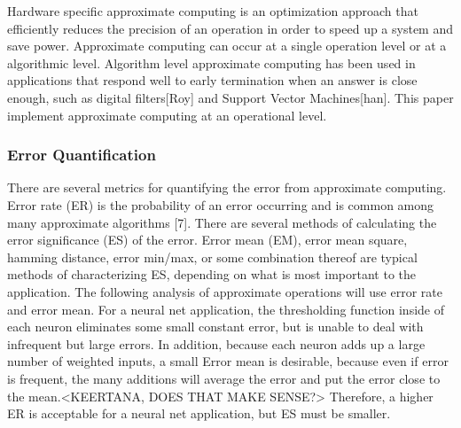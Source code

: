\documentclass[journal]{IEEEtran}
\begin{document}
	\indent Hardware specific approximate computing is an optimization approach that efficiently reduces the precision of an operation in order to speed up a system and save power. Approximate computing can occur at a single operation level or at a algorithmic level. Algorithm level approximate computing has been used in applications that respond well to early termination when an answer is close enough, such as digital filters[Roy] and Support Vector Machines[han]. This paper implement approximate computing at an operational level.\\
	

	\subsubsection{Error Quantification}
	\indent 	There are several metrics for quantifying the error from approximate computing. Error rate (ER) is the probability of an error occurring and is common among many approximate algorithms [7]. There are several methods of calculating the error significance (ES) of the error. Error mean (EM), error mean square, hamming distance, error min/max, or some combination thereof are typical methods of characterizing ES, depending on what is most important to the application. The following analysis of approximate operations will use error rate and error mean. For a neural net application, the thresholding function inside of each neuron eliminates some small constant error, but is unable to deal with infrequent but large errors. In addition, because each neuron adds up a large number of weighted inputs, a small Error mean is desirable, because even if error is frequent, the many additions will average the error and put the error close to the mean.<KEERTANA, DOES THAT MAKE SENSE?>  Therefore, a higher ER is acceptable for a neural net application, but ES must be smaller. \\	
	
\end{document}

